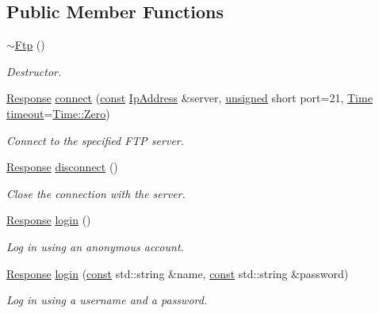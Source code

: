 \subsection*{Public Member Functions}
\begin{DoxyCompactItemize}
\item 
\hyperlink{classsf_1_1_ftp_a2edfa8e9009caf27bce74459ae76dc52}{$\sim$\-Ftp} ()
\begin{DoxyCompactList}\small\item\em Destructor. \end{DoxyCompactList}\item 
\hyperlink{classsf_1_1_ftp_1_1_response}{Response} \hyperlink{classsf_1_1_ftp_af02fb3de3f450a50a27981961c69c860}{connect} (\hyperlink{term__entry_8h_a57bd63ce7f9a353488880e3de6692d5a}{const} \hyperlink{classsf_1_1_ip_address}{Ip\-Address} \&server, \hyperlink{curses_8priv_8h_aca40206900cfc164654362fa8d4ad1e6}{unsigned} short port=21, \hyperlink{classsf_1_1_time}{Time} \hyperlink{_ndk_8cpp_a174cf046f3b5dbb1258515b3f138b8c7}{timeout}=\hyperlink{classsf_1_1_time_aa343e67f43a940e7b3b51aa10a495f2f}{Time\-::\-Zero})
\begin{DoxyCompactList}\small\item\em Connect to the specified F\-T\-P server. \end{DoxyCompactList}\item 
\hyperlink{classsf_1_1_ftp_1_1_response}{Response} \hyperlink{classsf_1_1_ftp_acf7459926f3391cd06bf84337ed6a0f4}{disconnect} ()
\begin{DoxyCompactList}\small\item\em Close the connection with the server. \end{DoxyCompactList}\item 
\hyperlink{classsf_1_1_ftp_1_1_response}{Response} \hyperlink{classsf_1_1_ftp_a686262bc377584cd50e52e1576aa3a9b}{login} ()
\begin{DoxyCompactList}\small\item\em Log in using an anonymous account. \end{DoxyCompactList}\item 
\hyperlink{classsf_1_1_ftp_1_1_response}{Response} \hyperlink{classsf_1_1_ftp_a99d8114793c1659e9d51d45cecdcd965}{login} (\hyperlink{term__entry_8h_a57bd63ce7f9a353488880e3de6692d5a}{const} std\-::string \&name, \hyperlink{term__entry_8h_a57bd63ce7f9a353488880e3de6692d5a}{const} std\-::string \&password)
\begin{DoxyCompactList}\small\item\em Log in using a username and a password. \end{DoxyCompactList}\item 

\end{DoxyCompactItemize}
